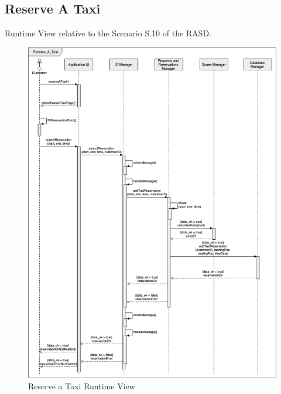 \documentclass[../../../../../../dd.tex]{subfiles}
\begin{document}
	\subsection{Reserve A Taxi}
		Runtime View relative to the Scenario S.10 of the RASD.
		\begin{figure}[H]
				\centering
				\includegraphics[width=\textwidth, scale=0.5]{../images/SequenceDiagrams/reserveATaxi.png}
			\caption{Reserve a Taxi Runtime View}\label{fig:RuntimeReserveATaxi}
		\end{figure}
		
\end{document}
